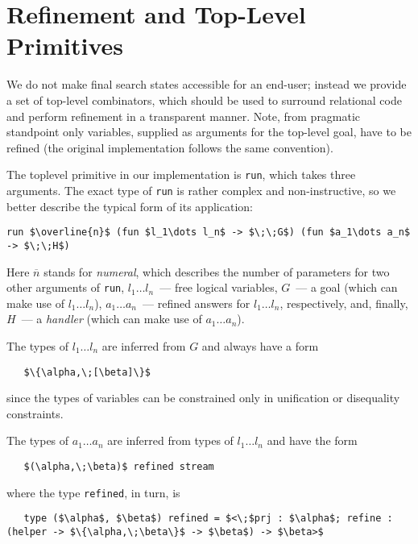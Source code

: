 \section{Refinement and Top-Level Primitives}
\label{refinement}

We do not make final search states accessible for an end-user; instead we provide
a set of top-level combinators, which should be used to surround relational code
and perform refinement in a transparent manner. Note, from pragmatic
standpoint only variables, supplied as arguments for the top-level goal, have
to be refined (the original \miniKanren implementation follows the same convention).

The toplevel primitive in our implementation is \lstinline{run}, which takes three
arguments. The exact type of \lstinline{run} is rather complex and non-instructive, 
so we better describe the typical form of its application:

\begin{lstlisting}[mathescape=true]
   run $\overline{n}$ (fun $l_1\dots l_n$ -> $\;\;G$) (fun $a_1\dots a_n$ -> $\;\;H$)
\end{lstlisting}

Here $\overline{n}$ stands for \emph{numeral}, which describes the number of
parameters for two other arguments of \lstinline{run}, \mbox{$l_1\dots l_n$}~---
free logical variables, $G$~--- a goal (which can make use of \mbox{$l_1\dots l_n$}), 
\mbox{$a_1\dots a_n$}~--- refined answers for \mbox{$l_1\dots l_n$}, respectively, and, 
finally, $H$~--- a \emph{handler} (which can make use of \mbox{$a_1\dots a_n$}). 

The types of \mbox{$l_1\dots l_n$} are inferred from $G$ and always have a form

\begin{lstlisting}
   $\{\alpha,\;[\beta]\}$
\end{lstlisting}

since the types of variables can be constrained only in unification or disequality constraints.

The types of \mbox{$a_1\dots a_n$} are inferred from types of \mbox{$l_1\dots l_n$} and
have the form

\begin{lstlisting}
   $(\alpha,\;\beta)$ refined stream
\end{lstlisting}

where the type \lstinline{refined}, in turn, is

\begin{lstlisting}
   type ($\alpha$, $\beta$) refined = $<\;$prj : $\alpha$; refine : (helper -> $\{\alpha,\;\beta\}$ -> $\beta$) -> $\beta>$
\end{lstlisting}

